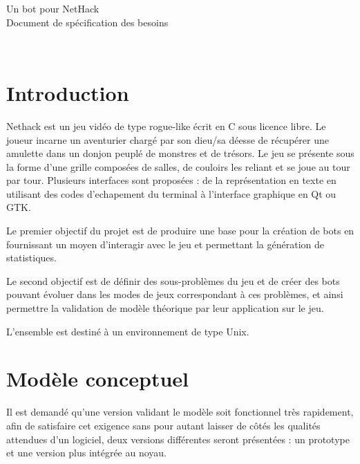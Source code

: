 \documentclass[12pt]{article}
\title{}
\author{\ST\\\QL\\\LL\\\DB\\\AH\\\BR\\\LH}
\begin{document}
\begin{center}
	{\Huge{Un bot pour NetHack \\ \vspace{2cm} Document de spécification des besoins}}
\end{center}

\vspace{2cm}



\vspace{4.2cm}

\\
\pagebreak

\section{Introduction}

Nethack est un jeu vidéo de type rogue-like écrit en C sous licence libre. Le joueur incarne un aventurier chargé par son dieu/sa déesse de récupérer une amulette dans un donjon peuplé de monstres et de trésors. Le jeu se présente sous la forme d'une grille composées de salles, de couloirs les reliant et se joue au tour par tour. Plusieurs interfaces sont proposées : de la représentation en texte en utilisant des codes d'echapement du terminal à l'interface graphique en Qt ou GTK.

Le premier objectif du projet est de produire une base pour la création de bots en fournissant un moyen d'interagir avec le jeu et permettant la génération de statistiques.

Le second objectif est de définir des sous-problèmes du jeu et de créer des bots pouvant évoluer dans les modes de jeux correspondant à ces problèmes, et ainsi permettre la validation de modèle théorique par leur application sur le jeu.

L'ensemble est destiné à un environnement de type Unix.


\section{Modèle conceptuel}

Il est demandé qu'une version validant le modèle soit fonctionnel très rapidement, afin de satisfaire cet exigence sans pour autant laisser de côtés les qualités attendues d'un logiciel, deux versions différentes seront présentées : un prototype et une version plus intégrée au noyau.
\end{document}
